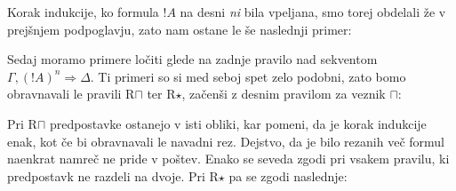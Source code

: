Korak indukcije, ko formula $!A$ na desni \emph{ni} bila vpeljana, smo torej obdelali že v prejšnjem podpoglavju, zato nam ostane le še naslednji primer:
\begin{prooftree}
\end{prooftree}
Sedaj moramo primere ločiti glede na zadnje pravilo nad sekventom $\Gamma,(!A)^n \Rightarrow \Delta$. Ti primeri so si med seboj spet zelo podobni, zato bomo obravnavali le pravili R$\sqcap$ ter R$\star$, začenši z desnim pravilom za veznik $\sqcap$:
\begin{prooftree}

\end{prooftree}
\dol
\begin{prooftree} \footnotesize



\end{prooftree}
Pri R$\sqcap$ predpostavke ostanejo v isti obliki, kar pomeni, da je korak indukcije enak, kot če bi obravnavali le navadni rez. Dejstvo, da je bilo rezanih več formul naenkrat namreč ne pride v poštev. Enako se seveda zgodi pri vsakem pravilu, ki predpostavk ne razdeli na dvoje. Pri R$\star$ pa se zgodi naslednje:
\begin{prooftree}

\end{prooftree}
